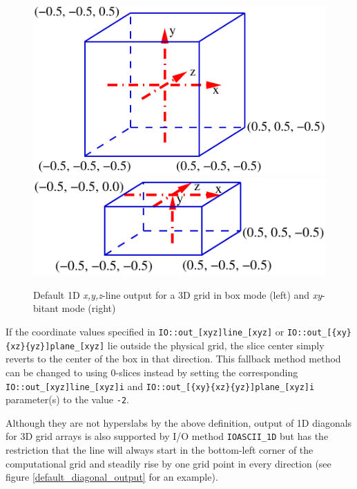 \documentclass{article}
\begin{document}
\begin{figure}[ht]
\begin{center}
\includegraphics{1Dlines_in_box}
\includegraphics{1Dlines_in_xyBitant}
\end{center}
\caption{Default 1D {\it x,y,z}-line output for a 3D grid in box mode (left) and {\it xy}-bitant mode (right)}
\label{default_1D_output}
\end{figure}

If the coordinate values specified in {\tt IO::out\_[xyz]line\_[xyz]}
or {\tt IO::out\_[\{xy\}\{xz\}\{yz\}]plane\_[xyz]} lie outside the physical
grid, the slice center simply reverts to the center of the box in that
direction. This fallback method method can be changed to using 0-slices instead
by setting the corresponding {\tt IO::out\_[xyz]line\_[xyz]i}
and {\tt IO::out\_[\{xy\}\{xz\}\{yz\}]plane\_[xyz]i} parameter(s) to the value
{\tt -2}.

Although they are not hyperslabs by the above definition, output of 1D diagonals
for 3D grid arrays is also supported by I/O method {\tt IOASCII\_1D} but has the
restriction that the line will always start in the bottom-left corner of the
computational grid and steadily rise by one grid point in every direction (see
figure \ref{default_diagonal_output} for an example).
\end{document}

